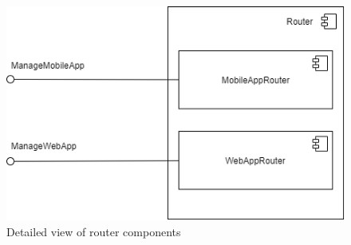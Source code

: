     \begin{figure}[H]
        \includegraphics[scale=0.8]{dd/resources/images/RouterComponents.png}
        \caption{Detailed view of router components}        
    \end{figure}
    \newpage
